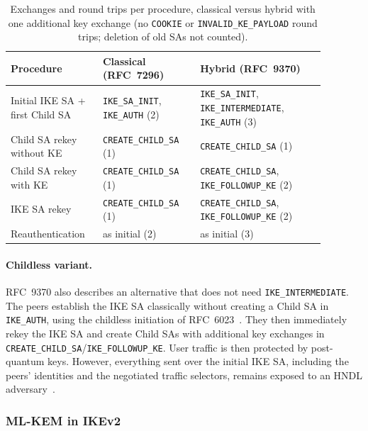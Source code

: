 \begin{table}[!h] \centering
    \caption{Exchanges and round trips per procedure, classical versus hybrid
    with one additional key exchange (no \texttt{COOKIE} or
    \texttt{INVALID\_KE\_PAYLOAD} round trips; deletion of old SAs not counted).}
    \label{tab:rtt}
    \begin{tabular}{| p{0.24\linewidth} | p{0.28\linewidth} | p{0.36\linewidth} |} \hline
        Procedure & Classical (RFC~7296) & Hybrid (RFC~9370) \\ \hline\hline
        Initial IKE SA + first Child SA
            & \texttt{IKE\_SA\_INIT}, \texttt{IKE\_AUTH} (2)
            & \texttt{IKE\_SA\_INIT}, \texttt{IKE\_INTERMEDIATE}, \texttt{IKE\_AUTH} (3) \\ \hline
        Child SA rekey without KE
            & \texttt{CREATE\_CHILD\_SA} (1)
            & \texttt{CREATE\_CHILD\_SA} (1) \\ \hline
        Child SA rekey with KE
            & \texttt{CREATE\_CHILD\_SA} (1)
            & \texttt{CREATE\_CHILD\_SA}, \texttt{IKE\_FOLLOWUP\_KE} (2) \\ \hline
        IKE SA rekey
            & \texttt{CREATE\_CHILD\_SA} (1)
            & \texttt{CREATE\_CHILD\_SA}, \texttt{IKE\_FOLLOWUP\_KE} (2) \\ \hline
        Reauthentication
            & as initial (2)
            & as initial (3) \\ \hline
    \end{tabular}
\end{table}

\paragraph{Childless variant.}
RFC~9370 also describes an alternative that does not need
\texttt{IKE\_INTERMEDIATE}. The peers establish the IKE SA classically
without creating a Child SA in \texttt{IKE\_AUTH}, using the childless
initiation of RFC~6023~\cite{rfc6023}. They then immediately rekey the IKE SA
and create Child SAs with additional key exchanges in
\texttt{CREATE\_CHILD\_SA}/\texttt{IKE\_FOLLOWUP\_KE}. User traffic is then
protected by post-quantum keys. However, everything sent over the initial IKE
SA, including the peers' identities and the negotiated traffic selectors,
remains exposed to an HNDL adversary~\cite{rfc9370,ikev2mlkem}.

\subsubsection{ML-KEM in IKEv2}
\label{sec:sota-mlkem}

